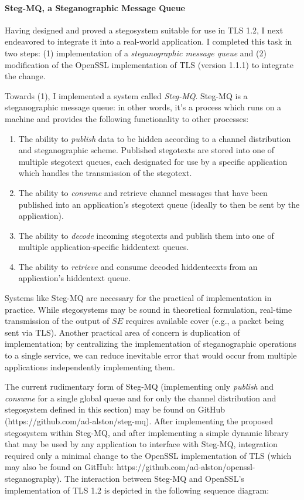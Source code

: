 \documentclass{article}
\begin{document}
\paragraph{Steg-MQ, a Steganographic Message Queue}

Having designed and proved a stegosystem suitable for use in TLS 1.2, I next endeavored to integrate it into a real-world application.
I completed this task in two steps: (1) implementation of a \textit{steganographic message queue} and (2) modification of the OpenSSL
implementation of TLS (version 1.1.1) to integrate the change.

Towards (1), I implemented a system called \textit{Steg-MQ}.  Steg-MQ is a steganographic message queue: in other words, it's a process
which runs on a machine and provides the following functionality to other processes:

\begin{enumerate}
\item{The ability to \textit{publish} data to be hidden according to a channel distribution and steganographic scheme.  Published 
stegotexts are stored into one of multiple stegotext queues, each designated for use by a specific application which handles the transmission 
of the stegotext.}
\item{The ability to \textit{consume} and retrieve channel messages that have been published into an application's stegotext queue (ideally to then 
be sent by the application).}
\item{The ability to \textit{decode} incoming stegotexts and publish them into one of multiple application-specific hiddentext queues.}
\item{The ability to \textit{retrieve} and consume decoded hiddenteexts from an application's hiddentext queue.}
\end{enumerate}

\noindent Systems like Steg-MQ are necessary for the practical of implementation in practice.  While stegosystems may be sound in 
theoretical formulation, real-time transmission of the output of $SE$ requires available cover (e.g., a packet being sent 
via TLS).  Another practical area of concern is duplication of implementation; by centralizing the implementation of steganographic 
operations to a single service, we can reduce inevitable error that would occur from multiple applications independently implementing them.

The current rudimentary form of Steg-MQ (implementing only \textit{publish} and \textit{consume} for a single global queue and 
for only the channel distribution and stegosystem defined in this section) may be found on GitHub (https://github.com/ad-alston/steg-mq).
\newline\newline
After implementing the proposed stegosystem within Steg-MQ, and after implementing a simple dynamic library that may be used by 
any application to interface with Steg-MQ, integration required only a minimal change to the OpenSSL implementation of TLS (which may also 
be found on GitHub: https://github.com/ad-alston/openssl-steganography).  The interaction between Steg-MQ and OpenSSL's implementation of 
TLS 1.2 is depicted in the following sequence diagram:
\end{document}

